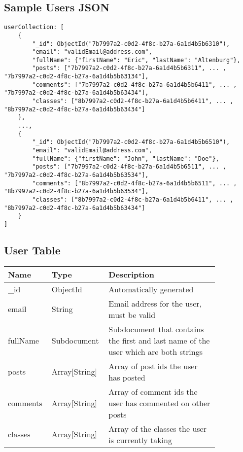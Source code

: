 \documentclass[preprint,11pt,3p]{article}
\begin{document}
\subsection{Sample Users JSON}
\begin{lstlisting}
userCollection: [
	{
		"_id": ObjectId("7b7997a2-c0d2-4f8c-b27a-6a1d4b5b6310"),
		"email": "validEmail@address.com",
		"fullName": {"firstName": "Eric", "lastName": "Altenburg"},
		"posts": ["7b7997a2-c0d2-4f8c-b27a-6a1d4b5b6311", ... , "7b7997a2-c0d2-4f8c-b27a-6a1d4b5b63134"],
		"comments": ["7b7997a2-c0d2-4f8c-b27a-6a1d4b5b6411", ... , "7b7997a2-c0d2-4f8c-b27a-6a1d4b5b63434"],
		"classes": ["8b7997a2-c0d2-4f8c-b27a-6a1d4b5b6411", ... , "8b7997a2-c0d2-4f8c-b27a-6a1d4b5b63434"]
	},
	...,
	{
		"_id": ObjectId("7b7997a2-c0d2-4f8c-b27a-6a1d4b5b6510"),
		"email": "validEmail@address.com",
		"fullName": {"firstName": "John", "lastName": "Doe"},
		"posts": ["7b7997a2-c0d2-4f8c-b27a-6a1d4b5b6511", ... , "7b7997a2-c0d2-4f8c-b27a-6a1d4b5b63534"],
		"comments": ["8b7997a2-c0d2-4f8c-b27a-6a1d4b5b6511", ... , "8b7997a2-c0d2-4f8c-b27a-6a1d4b5b63534"],
		"classes": ["8b7997a2-c0d2-4f8c-b27a-6a1d4b5b6411", ... , "8b7997a2-c0d2-4f8c-b27a-6a1d4b5b63434"]
	}
]
\end{lstlisting}

\subsection{User Table}
\begingroup
\setlength{\tabcolsep}{15pt} %
\renewcommand{\arraystretch}{1.5} %
\begin{tabular}{| p{0.15\linewidth} | p{0.20\linewidth} | p{0.5\linewidth} |}
	\hline
	\textbf{Name} & \textbf{Type} & \textbf{Description} \\
	\hline
	_id & ObjectId & Automatically generated\\
	\hline
	email & String & Email address for the user, must be valid\\
	\hline
	fullName & Subdocument & Subdocument that contains the first and last name of the user which are both strings\\
	\hline
	posts & Array[String] & Array of post ids the user has posted\\
	\hline
	comments & Array[String] & Array of comment ids the user has commented on other posts\\
	\hline
	classes & Array[String] & Array of the classes the user is currently taking\\
	\hline
\end{tabular}
\endgroup
\end{document}
